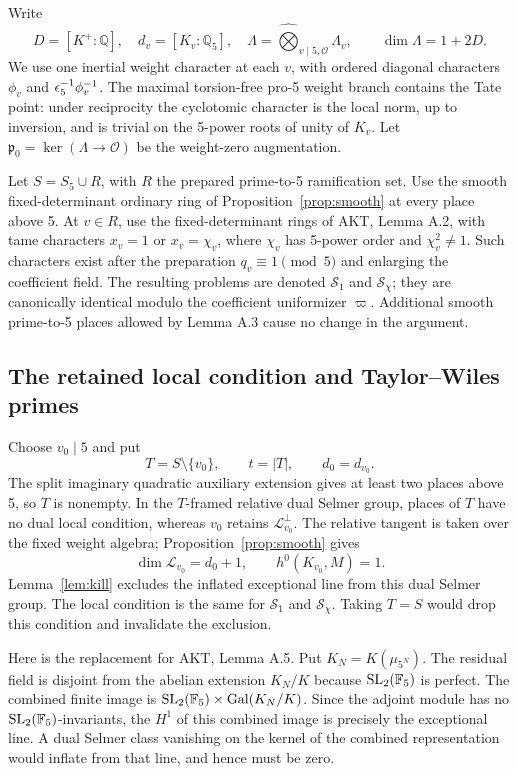 \documentclass[11pt,a4paper]{article}
\theoremstyle{definition}\newtheorem{definition}[theorem]{Definition}
\theoremstyle{remark}\newtheorem*{remark}{Remark}
\newcommand{\Q}{\mathbb Q}\newcommand{\Z}{\mathbb Z}
\newcommand{\F}{\mathbb F}\newcommand{\OO}{\mathcal O}
\newcommand{\Gal}{\operatorname{Gal}}\newcommand{\Res}{\operatorname{Res}}
\begin{document}
Write
\[
D=[K^+:\Q],\quad d_v=[K_v:\Q_5],\quad
\Lambda=\widehat\bigotimes_{v\mid5,\OO}\Lambda_v,
\qquad \dim\Lambda=1+2D.
\]
We use one inertial weight character at each $v$, with ordered diagonal
characters $\phi_v$ and $\epsilon_5^{-1}\phi_v^{-1}$. The maximal torsion-free
pro-5 weight branch contains the Tate point: under reciprocity the cyclotomic
character is the local norm, up to inversion, and is trivial on the 5-power
roots of unity of $K_v$. Let
$\mathfrak p_0=\ker(\Lambda\to\OO)$ be the weight-zero augmentation.

Let $S=S_5\cup R$, with $R$ the prepared prime-to-5 ramification set. Use
the smooth fixed-determinant ordinary ring of Proposition~\ref{prop:smooth}
at every place above 5. At $v\in R$, use the fixed-determinant rings of AKT,
Lemma A.2, with tame characters $x_v=1$ or $x_v=\chi_v$, where $\chi_v$ has
5-power order and $\chi_v^2\ne1$. Such characters exist after the preparation
$q_v\equiv1\pmod5$ and enlarging the coefficient field. The resulting problems
are denoted $\mathcal S_1$ and $\mathcal S_\chi$; they are canonically identical
modulo the coefficient uniformizer $\varpi$. Additional smooth prime-to-5
places allowed by Lemma A.3 cause no change in the argument.

\subsection{The retained local condition and Taylor--Wiles primes}

Choose $v_0\mid5$ and put
\[
T=S\setminus\{v_0\},\qquad t=|T|,\qquad d_0=d_{v_0}.
\]
The split imaginary quadratic auxiliary extension gives at least two places
above 5, so $T$ is nonempty. In the $T$-framed relative dual Selmer group,
places of $T$ have no dual local condition, whereas $v_0$ retains
$\mathcal L_{v_0}^{\perp}$. The relative tangent is taken over the fixed
weight algebra; Proposition~\ref{prop:smooth} gives
\[
\dim\mathcal L_{v_0}=d_0+1,\qquad h^0(K_{v_0},M)=1.
\]
Lemma~\ref{lem:kill} excludes the inflated exceptional line from this dual
Selmer group. The local condition is the same for $\mathcal S_1$ and
$\mathcal S_\chi$. Taking $T=S$ would drop this condition and invalidate
the exclusion.

Here is the replacement for AKT, Lemma A.5. Put $K_N=K(\mu_{5^N})$.
The residual field is disjoint from the abelian extension $K_N/K$ because
$\SL_2(\F_5)$ is perfect. The combined finite image is
$\SL_2(\F_5)\times\Gal(K_N/K)$. Since the adjoint module has no
$\SL_2(\F_5)$-invariants, the $H^1$ of this combined image is precisely the
exceptional line. A dual Selmer class vanishing on the kernel of the combined
representation would inflate from that line, and hence must be zero.
\end{document}
